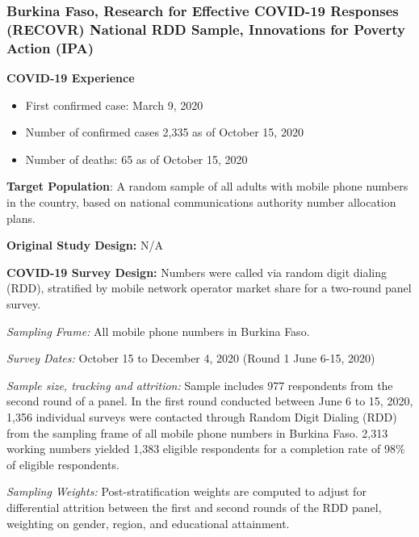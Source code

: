 \documentclass[
  12pt,
]{article}
\begin{document}
\hypertarget{burkina-faso-research-for-effective-covid-19-responses-recovr-national-rdd-sample-innovations-for-poverty-action-ipa}{%
\subsubsection*{Burkina Faso, Research for Effective COVID-19 Responses (RECOVR) National RDD Sample, Innovations for Poverty Action (IPA)}\label{burkina-faso-research-for-effective-covid-19-responses-recovr-national-rdd-sample-innovations-for-poverty-action-ipa}}

\textbf{COVID-19 Experience}

\begin{itemize}
\item First confirmed case: March 9, 2020 
\item Number of confirmed cases 2,335 as of  October 15, 2020 
\item Number of deaths:  65 as of October 15, 2020
\end{itemize}

\textbf{Target Population}: A random sample of all adults with mobile phone numbers in the country, based on national communications authority number allocation plans.

\textbf{Original Study Design:} N/A

\textbf{COVID-19 Survey Design:} Numbers were called via random digit dialing (RDD), stratified by mobile network operator market share for a two-round panel survey.

\emph{Sampling Frame:} All mobile phone numbers in Burkina Faso.

\emph{Survey Dates:} October 15 to December 4, 2020 (Round 1 June 6-15, 2020)

\emph{Sample size, tracking and attrition:} Sample includes 977 respondents from the second round of a panel. In the first round conducted between June 6 to 15, 2020, 1,356 individual surveys were contacted through Random Digit Dialing (RDD) from the sampling frame of all mobile phone numbers in Burkina Faso. 2,313 working numbers yielded 1,383 eligible respondents for a completion rate of 98\% of eligible respondents.

\emph{Sampling Weights:} Post-stratification weights are computed to adjust for differential attrition between the first and second rounds of the RDD panel, weighting on gender, region, and educational attainment.
\end{document}
